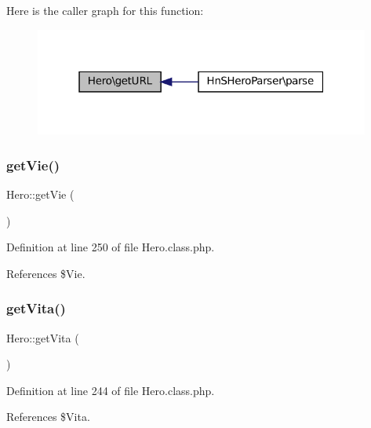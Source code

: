 Here is the caller graph for this function\+:\nopagebreak
\begin{figure}[H]
\begin{center}
\leavevmode
\includegraphics[width=313pt]{class_hero_a4e52b2f4e896ade773b1cedac0857f4e_icgraph}
\end{center}
\end{figure}
\mbox{\label{class_hero_a8dbad04d3df0c4451fd0eca90c795e2e}} 
\subsubsection{\texorpdfstring{get\+Vie()}{getVie()}}
{\footnotesize\ttfamily Hero\+::get\+Vie (\begin{DoxyParamCaption}{ }\end{DoxyParamCaption})}



Definition at line 250 of file Hero.\+class.\+php.



References \$\+Vie.

\mbox{\label{class_hero_a8ad56bd0376afaf55d98d68cd24f6f29}} 
\subsubsection{\texorpdfstring{get\+Vita()}{getVita()}}
{\footnotesize\ttfamily Hero\+::get\+Vita (\begin{DoxyParamCaption}{ }\end{DoxyParamCaption})}



Definition at line 244 of file Hero.\+class.\+php.



References \$\+Vita.

\mbox{\label{class_hero_afedf929b889d53bc2ce666ad5288aca0}} 
